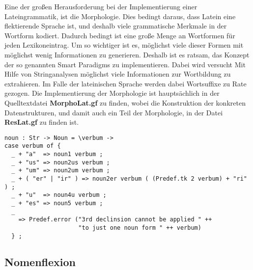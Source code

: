 Eine der großen Herausforderung bei der Implementierung einer Lateingrammatik, ist die Morphologie. Dies bedingt daraus, dass Latein eine flektierende Sprache ist, und deshalb viele grammatische Merkmale in der Wortform kodiert. Dadurch bedingt ist eine große Menge an Wortformen für jeden Lexikoneintrag. Um so wichtiger ist es, möglichst viele dieser Formen mit möglichst wenig Informationen zu generieren. Deshalb ist es ratsam, das Konzept der so genannten Smart Paradigms zu implementieren. Dabei wird versucht Mit Hilfe von Stringanalysen möglichst viele Informationen zur Wortbildung zu extrahieren. Im Falle der lateinischen Sprache werden dabei Wortsuffixe zu Rate gezogen. Die Implementierung der Morphologie ist hauptsächlich in der Quelltextdatei \textbf{MorphoLat.gf} zu finden, wobei die Konstruktion der konkreten Datenstrukturen, und damit auch ein Teil der Morphologie, in der Datei \textbf{ResLat.gf} zu finden ist.
\begin{lstlisting}[float=ht,caption={Beispiel für ein Smart Paradigm mit Hilfe von Pattern matching},label={GF-Morpho-Noun}]
noun : Str -> Noun = \verbum -> 
case verbum of {
  _ + "a"  => noun1 verbum ;
  _ + "us" => noun2us verbum ;
  _ + "um" => noun2um verbum ;
  _ + ( "er" | "ir" ) => noun2er verbum ( (Predef.tk 2 verbum) + "ri" ) ;
  _ + "u"  => noun4u verbum ;
  _ + "es" => noun5 verbum ;
  _  
    => Predef.error ("3rd declinsion cannot be applied " ++ 
                     "to just one noun form " ++ verbum)
  } ;
\end{lstlisting}
\subsection{Nomenflexion}
\label{subsec:nomen}
